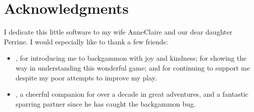 \documentclass[letterpaper,10pt,english]{sphinxmanual}
\begin{document}
\chapter{Acknowledgments}
\label{\detokenize{index:remerciements}}
\sphinxAtStartPar
I dedicate this little software to my wife Anne\sphinxhyphen{}Claire and our dear daughter Perrine. I would especially like to thank a few friends:
\begin{itemize}
\item {} 
\sphinxAtStartPar
{}, for introducing me to backgammon with joy and kindness; for showing the way in understanding this wonderful game; and for continuing to support me despite my poor attempts to improve my play.

\item {} 
\sphinxAtStartPar
{}, a cheerful companion for over a decade in great adventures, and a fantastic sparring partner since he has caught the backgammon bug.

\end{itemize}



\renewcommand{\indexname}{Index}
\printindex
\end{document}
